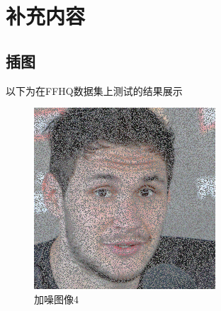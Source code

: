 
\chapter{补充内容}
\label{appendix}
\section{插图}
以下为在FFHQ数据集上测试的结果展示
\begin{figure}[H]
  \centering
  \begin{minipage}[b]{0.3\linewidth}
\includegraphics[width=\linewidth]{Picture/input/00004.png}
    \caption{加噪图像4}
    \label{noised image }
  \end{minipage}
  \hspace{0.1cm} %
   \begin{minipage}[b]{0.3\linewidth}

\end{minipage}
\end{figure}
